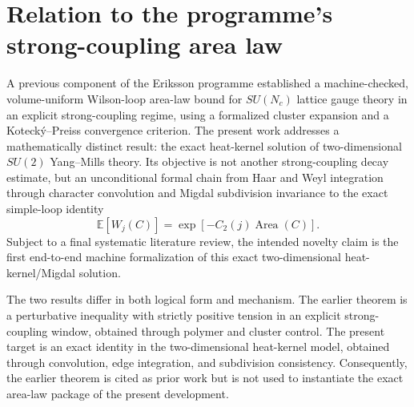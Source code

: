 \section{Relation to the programme's strong-coupling area law}

A previous component of the Eriksson programme established a machine-checked,
volume-uniform Wilson-loop area-law bound for $SU(N_c)$ lattice gauge theory in
an explicit strong-coupling regime, using a formalized cluster expansion and a
Koteck\'y--Preiss convergence criterion.  The present work addresses a
mathematically distinct result: the exact heat-kernel solution of
two-dimensional $SU(2)$ Yang--Mills theory.  Its objective is not another
strong-coupling decay estimate, but an unconditional formal chain from Haar and
Weyl integration through character convolution and Migdal subdivision
invariance to the exact simple-loop identity
\[
  \mathbb{E}[W_j(C)]
  = \exp\!\left[-C_2(j)\operatorname{Area}(C)\right].
\]
Subject to a final systematic literature review, the intended novelty claim is
the first end-to-end machine formalization of this exact two-dimensional
heat-kernel/Migdal solution.

The two results differ in both logical form and mechanism.  The earlier theorem
is a perturbative inequality with strictly positive tension in an explicit
strong-coupling window, obtained through polymer and cluster control.  The
present target is an exact identity in the two-dimensional heat-kernel model,
obtained through convolution, edge integration, and subdivision consistency.
Consequently, the earlier theorem is cited as prior work but is not used to
instantiate the exact area-law package of the present development.
